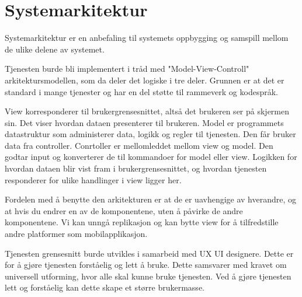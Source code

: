 \section{Systemarkitektur}
Systemarkitektur er en  anbefaling til systemets oppbygging og samspill mellom de ulike delene av systemet.

Tjenesten burde bli implementert i tråd med "Model-View-Controll" arkitektursmodellen, som da deler det logiske i tre deler. 
Grunnen er at det er standard i mange tjenester og har en del støtte til rammeverk og kodespråk. 

View korresponderer til brukergrensesnittet, altså det brukeren ser på skjermen sin. Det viser hvordan dataen presenterer til brukeren. 
Model er programmets datastruktur som administerer data, logikk og regler til tjenesten. Den får bruker data fra controller.
Conrtoller er mellomleddet mellom view og model. Den godtar input og konverterer de til kommandoer for model eller view. Logikken for hvordan dataen blir vist fram i brukergrensesnittet, og hvordan tjenesten responderer for ulike handlinger i view ligger her. 

Fordelen med å benytte den arkitekturen er at de er uavhengige av hverandre, og at hvis du endrer en av de komponentene, uten å påvirke de andre komponentene. 
Vi kan unngå replikasjon og kan bytte view for å tilfredstille andre platformer som mobilapplikasjon.

Tjenesten grensesnitt burde utvikles i samarbeid med UX UI designere. Dette er for å gjøre tjenesten forståelig og lett å bruke. Dette samsvarer 
med kravet om universell utforming, hvor alle skal kunne bruke tjenesten.
Ved å gjøre tjenesten lett og forståelig kan dette skape et større brukermasse. 




